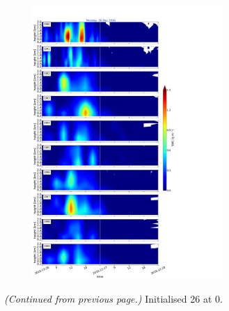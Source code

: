 \begin{figure}[t]\ContinuedFloat
	\centering
	\begin{subfigure}[t]{\textwidth}	
		\centering
		\includegraphics[trim={0cm 0cm 18.3cm 5.1cm},clip,width=0.8\textwidth]{./fig_09EM/20161226}
		\caption{}\label{fig:EM09_26}
	\end{subfigure}
	\caption{\textit{(Continued from previous page.)} Initialised \SI{26}{\dec} at \SI{0}{\UTC}.}
\end{figure}

